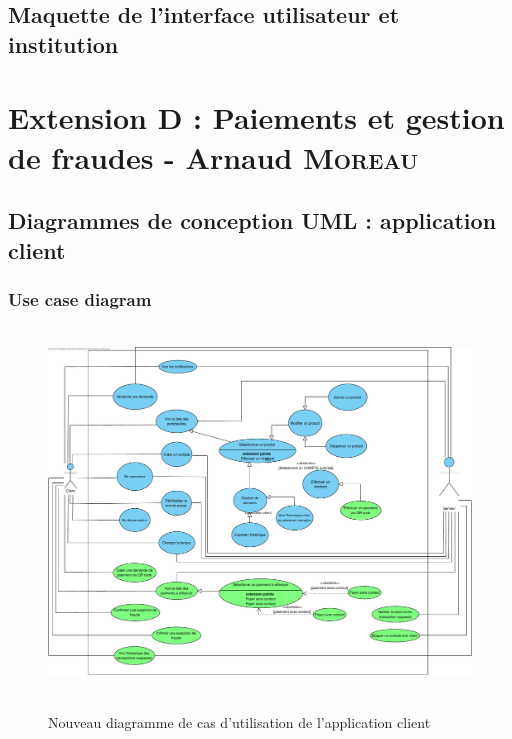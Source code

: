 \documentclass[]{report}
\begin{document}


\newpage

\section{Maquette de l'interface utilisateur et institution}



\newpage




\chapter{Extension D : Paiements et gestion de fraudes - Arnaud \textsc{Moreau}}





\newpage




\section{Diagrammes de conception UML : application client}




\subsection{Use case diagram}

\begin{figure}[h!]
\hspace{-1cm}
\hbox{
	\includegraphics[scale=0.45]{img/Use Case Client - Extension 6.pdf}
}
\caption{Nouveau diagramme de cas d'utilisation de l'application client}
\end{figure}
\end{document}
